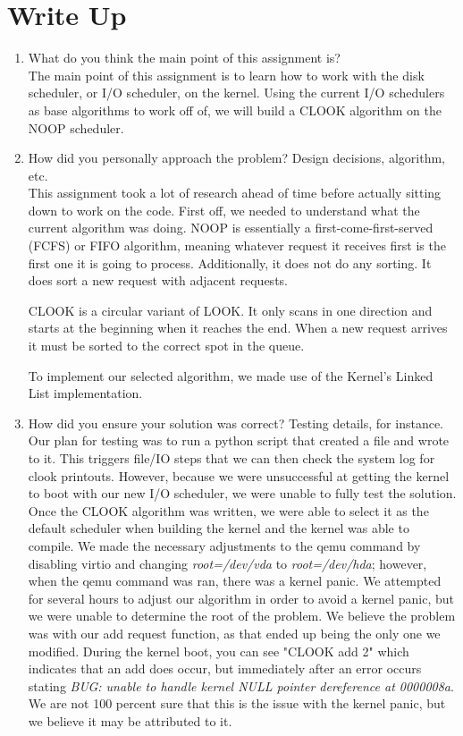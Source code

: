 \documentclass[letterpaper,10pt,draftclsnofoot,onecolumn,titlepage]{IEEEtran}
\begin{document}
\section{Write Up}
\begin{enumerate}
                \item What do you think the main point of this assignment is? \\
The main point of this assignment is to learn how to work with the disk scheduler, or I/O scheduler, on the kernel. 
Using the current I/O schedulers as base algorithms to work off of, we will build a CLOOK algorithm on the NOOP scheduler. 
                \item How did you personally approach the problem? Design decisions, algorithm, etc. \\
This assignment took a lot of research ahead of time before actually sitting down to work on the code. 
First off, we needed to understand what the current algorithm was doing. 
NOOP is essentially a first-come-first-served (FCFS) or FIFO algorithm, meaning whatever request it receives first is the first one it is going to process. 
Additionally, it does not do any sorting. It does sort a new request with adjacent requests. 

CLOOK is a circular variant of LOOK. It only scans in one direction and starts at the beginning when it reaches the end. When a new request arrives it must 
be sorted to the correct spot in the queue.

To implement our selected algorithm, we made use of the Kernel's Linked List implementation. 
                \item How did you ensure your solution was correct? Testing details, for instance.
Our plan for testing was to run a python script that created a file and wrote to it. 
This triggers file/IO steps that we can then check the system log for clook printouts. 
However, because we were unsuccessful at getting the kernel to boot with our new I/O scheduler, we were unable to fully test the solution. 
Once the CLOOK algorithm was written, we were able to select it as the default scheduler when building the kernel and the kernel was able to compile.
We made the necessary adjustments to the qemu command by disabling virtio and changing \textit{root=/dev/vda} to \textit{root=/dev/hda}; however, when the qemu command was ran, there was a kernel panic. 
We attempted for several hours to adjust our algorithm in order to avoid a kernel panic, but we were unable to determine the root of the problem. 
We believe the problem was with our add request function, as that ended up being the only one we modified. 
During the kernel boot, you can see "CLOOK add 2" which indicates that an add does occur, but immediately after an error occurs stating \textit{BUG: unable to handle kernel NULL pointer dereference at 0000008a}. 
We are not 100 percent sure that this is the issue with the kernel panic, but we believe it may be attributed to it. 


\end{enumerate}
\end{document}
